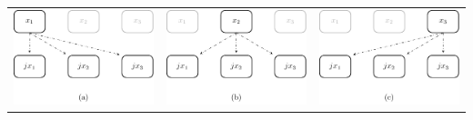 \documentclass[../../course]{subfiles}
\begin{document}
\begin{center}

    \renewcommand{\arraystretch}{0.75}
    \begin{NiceTabularX} {\textwidth} {
            *{3}{>{\centering\arraybackslash}X}
        }

         {
            \includegraphics[height = \textheight] {tikzpics/epicCplxCombFirst.pdf}
        }

        &

         {
            \includegraphics[height = \textheight] {tikzpics/epicCplxCombSecond.pdf}
        }

        &

         {
            \includegraphics[height = \textheight] {tikzpics/epicCplxCombThird.pdf}
        }


\end{NiceTabularX}
\end{center}
\end{document}
